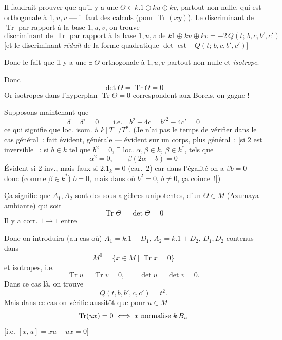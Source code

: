 \documentclass[11pt,a4paper]{article}
\begin{document}
Il faudrait prouver que \ill{} qu'il y a une $\Theta \in k.1 \oplus ku \oplus kv$, partout non nulle, qui est orthogonale à $1, u, v$ --- il faut des calculs (pour $\operatorname{Tr}(xy)$).
 Le discriminant de $\operatorname{Tr}$ par rapport à la base $1, u, v$, on trouve
\[
\text{discriminant de $\operatorname{Tr}$ par rapport à la base $1, u, v$ de $k1 \oplus ku \oplus kv$} = -2\,Q(t;\, b, c, b', c')
\]
[et le discriminant \emph{réduit} de la forme quadratique $\det$ est $-Q(t;\, b, c, b', c')$]

Donc le fait   que  il y a une $\exists\, \Theta$ orthogonale à $1, u, v$ partout non nulle et \emph{isotrope}.

Donc 
\[
\det\Theta = \operatorname{Tr}\Theta = 0
\]
Or    isotropes dans l'hyperplan $\operatorname{Tr}\Theta = 0$ correspondent aux Borels,  on gagne !

Supposons maintenant que
\[
\delta = \delta' = 0 \qquad \text{i.e.} \quad b^2 - 4c = b'^2 - 4c' = 0
\]
ce qui signifie que   loc. isom. à $k[T]/T^2$. (Je n'ai pas  le temps de vérifier dans le cas \struck{\ill{}} général~: fait évident, \ill{} \ill{}  générale --- évident sur un corps, plus général~: [si $2$ est inversible \ill{}~: si $b \in k$ tel que $b^2 = 0$, $\exists$ loc. $\alpha, \beta \in k$, $\beta \in k^*$, tels que
\[
\alpha^2 = 0, \qquad \beta(2\alpha + b) = 0
\]
Évident si $2$ inv., mais faux si $2.1_k = 0$ (car.~2) car  dans l'égalité on a $\beta b = 0$ donc (comme $\beta \in k^*$) $b = 0$, mais dans  où $b^2 = 0$, $b \neq 0$, ça coince~!])
\marginal{\ill{} \ill{} \ill{} \ill{} \ill{} \ill{}}

Ça signifie  que  $A_1, A_2$ sont des sous-algèbres unipotentes,    d'un $\Theta \in M$ (Azumaya ambiante) qui soit 
\[
\operatorname{Tr}\Theta = \det\Theta = 0
\]
 Il y a corr. $1 \to 1$ entre \ill{}

Donc on introduira \add{\ill{}} (au cas où) $A_1 = k.1 + D_1$, $A_2 = k.1 + D_2$, $D_1, D_2$ contenus dans
\[
M^0 = \{x \in M \mid \operatorname{Tr} x = 0\}
\]
et isotropes, i.e.
\[
\operatorname{Tr} u = \operatorname{Tr} v = 0, \qquad \det u = \det v = 0 .
\]
Dans ce cas là, on trouve
\[
Q(t, b, b', c, c') = t^2 .
\]
Mais dans ce cas on   vérifie aussitôt que pour $u \in M$
\[
\operatorname{Tr}(ux) = 0 \iff x \text{ normalise } \text{\struck{$k$}}\,B_u
\]
[i.e. $[x, u] = xu - ux = 0$]
\end{document}

